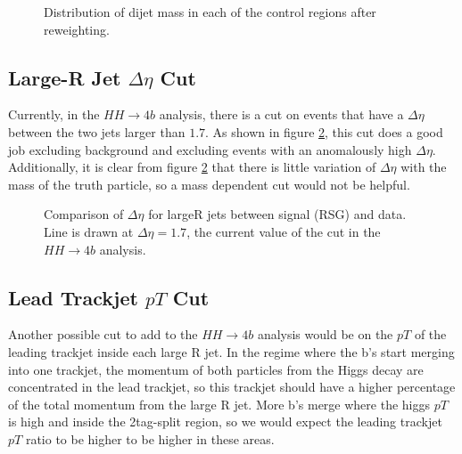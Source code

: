 \begin{figure}[htbp]
\begin{center}
\qquad
\qquad

\caption{Distribution of dijet mass in each of the control regions after reweighting.}
\label{fig:app-cut-control-Mhh}
\end{center}
\end{figure}

\subsection{Large-R Jet $\Delta\eta$ Cut}

Currently, in the $HH\to 4b$ analysis, there is a cut on events that have a $\Delta \eta$ between the two jets larger than $1.7$. As shown in figure \ref{fig:app-cut-deltaeta}, this cut does a good job excluding background and excluding events with an anomalously high $\Delta \eta$. Additionally, it is clear from figure \ref{fig:app-cut-deltaeta} that there is little variation of $\Delta\eta$ with the mass of the truth particle, so a mass dependent cut would not be helpful.

\begin{figure}[htbp]
\begin{center}
\caption{Comparison of $\Delta\eta$ for largeR jets between signal (RSG) and data. Line is drawn at $\Delta\eta = 1.7$, the current value of the cut in the $HH \to 4b$ analysis.}
\label{fig:app-cut-deltaeta}
\end{center}
\end{figure}

\subsection{Lead Trackjet $pT$ Cut}

Another possible cut to add to the $HH \to 4b$ analysis would be on the $pT$ of the leading trackjet inside each large R jet. In the regime where the b's start merging into one trackjet, the momentum of both particles from the Higgs decay are concentrated in the lead trackjet, so this trackjet should have a higher percentage of the total momentum from the large R jet. More b's merge where the higgs $pT$ is high and inside the 2tag-split region, so we would expect the leading trackjet $pT$ ratio to be higher to be higher in these areas.

